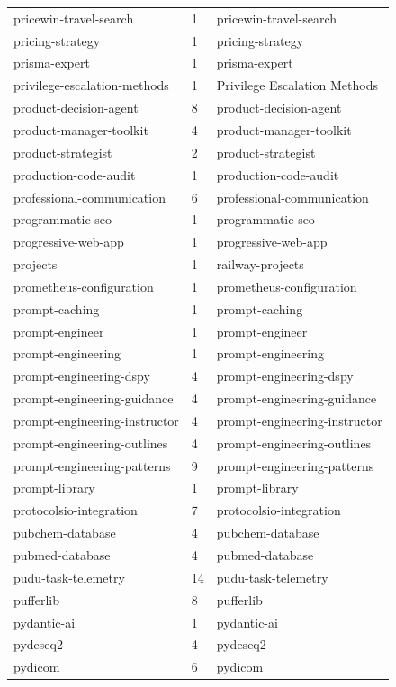 \begin{longtable}{@{}lll@{}}
pricewin-travel-search & 1 & pricewin-travel-search\\
pricing-strategy & 1 & pricing-strategy\\
prisma-expert & 1 & prisma-expert\\
privilege-escalation-methods & 1 & Privilege Escalation Methods\\
product-decision-agent & 8 & product-decision-agent\\
product-manager-toolkit & 4 & product-manager-toolkit\\
product-strategist & 2 & product-strategist\\
production-code-audit & 1 & production-code-audit\\
professional-communication & 6 & professional-communication\\
programmatic-seo & 1 & programmatic-seo\\
progressive-web-app & 1 & progressive-web-app\\
projects & 1 & railway-projects\\
prometheus-configuration & 1 & prometheus-configuration\\
prompt-caching & 1 & prompt-caching\\
prompt-engineer & 1 & prompt-engineer\\
prompt-engineering & 1 & prompt-engineering\\
prompt-engineering-dspy & 4 & prompt-engineering-dspy\\
prompt-engineering-guidance & 4 & prompt-engineering-guidance\\
prompt-engineering-instructor & 4 & prompt-engineering-instructor\\
prompt-engineering-outlines & 4 & prompt-engineering-outlines\\
prompt-engineering-patterns & 9 & prompt-engineering-patterns\\
prompt-library & 1 & prompt-library\\
protocolsio-integration & 7 & protocolsio-integration\\
pubchem-database & 4 & pubchem-database\\
pubmed-database & 4 & pubmed-database\\
pudu-task-telemetry & 14 & pudu-task-telemetry\\
pufferlib & 8 & pufferlib\\
pydantic-ai & 1 & pydantic-ai\\
pydeseq2 & 4 & pydeseq2\\
pydicom & 6 & pydicom\\

\end{longtable}
